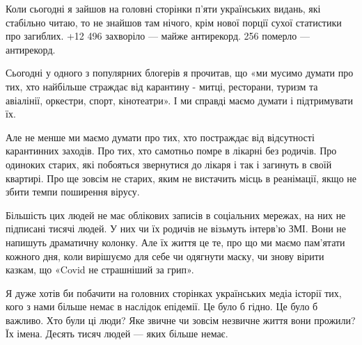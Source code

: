 Коли сьогодні я зайшов на головні сторінки п’яти українських видань, які
стабільно читаю, то не знайшов там нічого, крім нової порції сухої статистики
про загиблих. +12 496 захворіло --- майже антирекорд. 256 померло --- антирекорд. 

Сьогодні у одного з популярних блогерів я прочитав, що «ми мусимо думати про
тих, хто найбільше страждає від карантину - митці, ресторани, туризм та
авіалінії, оркестри, спорт, кінотеатри». І ми справді маємо думати і
підтримувати їх. 

Але не менше ми маємо думати про тих, хто постраждає від відсутності
карантинних заходів. Про тих, хто самотньо помре в лікарні без родичів. Про
одиноких старих, які побояться звернутися до лікаря і так і загинуть в своїй
квартирі. Про ще зовсім не старих, яким не вистачить місць в реанімації, якщо
не збити темпи поширення вірусу.

Більшість цих людей не має облікових записів в соціальних мережах, на них не
підписані тисячі людей. У них чи їх родичів не візьмуть інтерв’ю ЗМІ. Вони не
напишуть драматичну колонку. Але їх життя це те, про що ми маємо пам’ятати
кожного дня, коли вирішуємо для себе чи одягнути маску, чи знову вірити казкам,
що «Covid не страшніший за грип».

Я дуже хотів би побачити на головних сторінках українських медіа історії тих,
кого з нами більше немає в наслідок епідемії. Це було б гідно. Це було б
важливо. Хто були ці люди? Яке звичне чи зовсім незвичне життя вони прожили? Їх
імена. Десять тисяч людей --- яких більше немає.
